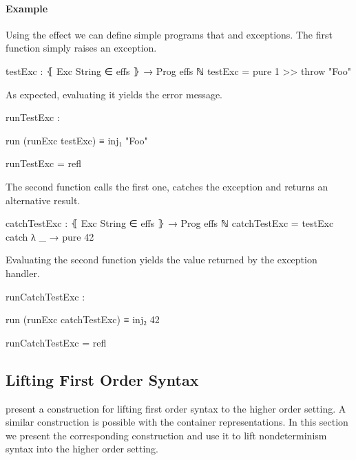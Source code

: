 \paragraph{Example}
Using the  effect we can define simple programs that
 and  exceptions.
The first function simply raises an exception.
\begin{code}
testExc : ⦃ Exc String ∈ effs ⦄ → Prog effs ℕ
testExc = pure 1 >> throw "Foo"
\end{code}
As expected, evaluating it yields the error message.
\begin{center}
\begin{code}
runTestExc :
\end{code}
\begin{code}[inline]
 run (runExc testExc) ≡ inj₁ "Foo"
\end{code}
\begin{code}
runTestExc = refl
\end{code}
\end{center}
The second function calls the first one, catches the exception and returns
an alternative result.
\begin{code}
catchTestExc : ⦃ Exc String ∈ effs ⦄ → Prog effs ℕ
catchTestExc = testExc catch λ _ → pure 42
\end{code}
Evaluating the second function yields the value returned by the exception
handler.
\begin{center}
\begin{code}
runCatchTestExc :
\end{code}
\begin{code}[inline]
 run (runExc catchTestExc) ≡ inj₂ 42
\end{code}
\begin{code}
runCatchTestExc = refl
\end{code}
\end{center}


\subsection{Lifting First Order Syntax}
\label{higher-order:lifting}

\textcite{DBLP:conf/haskell/WuSH14} present a construction for lifting first
order syntax to the higher order setting.
A similar construction is possible with the container representations.
In this section we present the corresponding construction and use it to
lift nondeterminism syntax into the higher order setting. 

